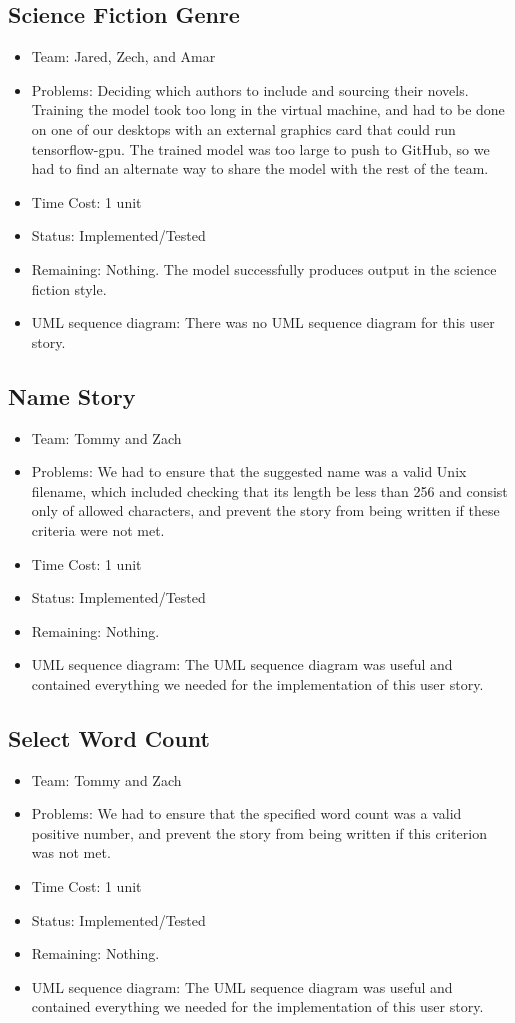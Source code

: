 \documentclass[12pt]{article}
\begin{document}
\subsection{Science Fiction Genre}
\begin{itemize}
\item Team: Jared, Zech, and Amar
\item Problems: Deciding which authors to include and sourcing their novels. Training the model took too long in the virtual machine, and had to be done on one of our desktops with an external graphics card that could run tensorflow-gpu. The trained model was too large to push to GitHub, so we had to find an alternate way to share the model with the rest of the team.
\item Time Cost: 1 unit 
\item Status: Implemented/Tested
\item Remaining: Nothing. The model successfully produces output in the science fiction style.
\item UML sequence diagram: There was no UML sequence diagram for this user story.
\end{itemize}

\subsection{Name Story}
\begin{itemize}
\item Team: Tommy and Zach
\item Problems: We had to ensure that the suggested name was a valid Unix filename, which included checking that its length be less than 256 and consist only of allowed characters, and prevent the story from being written if these criteria were not met.
\item Time Cost:  1 unit
\item Status: Implemented/Tested
\item Remaining: Nothing.
\item UML sequence diagram: The UML sequence diagram was useful and contained everything we needed for the implementation of this user story.
\end{itemize}

\subsection{Select Word Count}
\begin{itemize}
\item Team: Tommy and Zach
\item Problems: We had to ensure that the specified word count was a valid positive number, and prevent the story from being written if this criterion was not met.
\item Time Cost: 1 unit 
\item Status: Implemented/Tested
\item Remaining: Nothing.
\item UML sequence diagram: The  UML sequence diagram was useful and contained everything we needed for the implementation of this user story.
\end{itemize}
\end{document}
